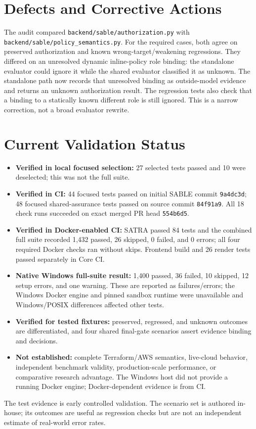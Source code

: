 \section{Defects and Corrective Actions}
\begin{sloppypar}
The audit compared \texttt{backend/sable/authorization.py} with \texttt{backend/sable/policy\_semantics.py}. For the required cases, both agree on preserved authorization and known wrong-target/weakening regressions. They differed on an unresolved dynamic inline-policy role binding: the standalone evaluator could ignore it while the shared evaluator classified it as unknown. The standalone path now records that unresolved binding as outside-model evidence and returns an unknown authorization result. The regression tests also check that a binding to a statically known different role is still ignored. This is a narrow correction, not a broad evaluator rewrite.
\end{sloppypar}

\section{Current Validation Status}
\begin{itemize}
    \item \textbf{Verified in local focused selection:} 27 selected tests passed and 10 were deselected; this was not the full suite.
    \item \textbf{Verified in CI:} 44 focused tests passed on initial SABLE commit \texttt{9a4dc3d}; 48 focused shared-assurance tests passed on source commit \texttt{84f91a9}. All 18 check runs succeeded on exact merged PR head \texttt{554b6d5}.
    \item \textbf{Verified in Docker-enabled CI:} SATRA passed 84 tests and the combined full suite recorded 1,432 passed, 26 skipped, 0 failed, and 0 errors; all four required Docker checks ran without skips. Frontend build and 26 render tests passed separately in Core CI.
    \item \textbf{Native Windows full-suite result:} 1,400 passed, 36 failed, 10 skipped, 12 setup errors, and one warning. These are reported as failures/errors; the Windows Docker engine and pinned sandbox runtime were unavailable and Windows/POSIX differences affected other tests.
    \item \textbf{Verified for tested fixtures:} preserved, regressed, and unknown outcomes are differentiated, and four shared final-gate scenarios assert evidence binding and decisions.
    \item \textbf{Not established:} complete Terraform/AWS semantics, live-cloud behavior, independent benchmark validity, production-scale performance, or comparative research advantage. The Windows host did not provide a running Docker engine; Docker-dependent evidence is from CI.
\end{itemize}

The test evidence is early controlled validation. The scenario set is authored in-house; its outcomes are useful as regression checks but are not an independent estimate of real-world error rates.
